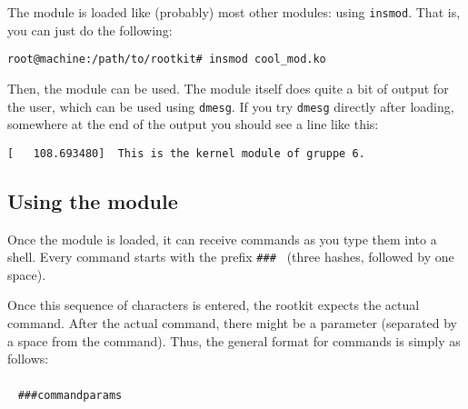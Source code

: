 \documentclass[10pt, letterpaper]{article}
\begin{document}
The module is loaded like (probably) most other modules: using \texttt{insmod}. That is, you can just do the following:

\begin{verbatim}
root@machine:/path/to/rootkit# insmod cool_mod.ko
\end{verbatim}

Then, the module can be used. The module itself does quite a bit of output for the user, which can be used using \texttt{dmesg}. If you try \texttt{dmesg} directly after loading, somewhere at the end of the output you should see a line like this:

\begin{verbatim}
[   108.693480]  This is the kernel module of gruppe 6.
\end{verbatim}

\subsection{Using the module}

\label{sec:using-the-module}

Once the module is loaded, it can receive commands as you type them into a shell. Every command starts with the prefix \texttt{\#\#\# } (three hashes, followed by one space).

Once this sequence of characters is entered, the rootkit expects the actual command. After the actual command, there might be a parameter (separated by a space from the command). Thus, the general format for commands is simply as follows:
\\~
\\~
\texttt{\#\#\#\textvisiblespace command\textvisiblespace params\textvisiblespace
}
\end{document}
